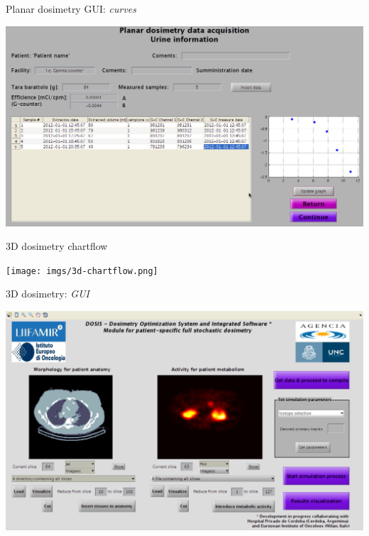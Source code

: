 \documentclass[ignorenonframetext,]{beamer}
\begin{document}
\begin{frame}{Planar dosimetry GUI: \emph{curves}}
\protect\hypertarget{planar-dosimetry-gui-curves}{}

\includegraphics{imgs/planar-curves.png}

\end{frame}

\begin{frame}{3D dosimetry chartflow}
\protect\hypertarget{d-dosimetry-chartflow}{}

\texttt{[image: imgs/3d-chartflow.png]}

\end{frame}

\begin{frame}{3D dosimetry: \emph{GUI}}
\protect\hypertarget{d-dosimetry-gui}{}

\includegraphics{imgs/3d-main.png}

\end{frame}
\end{document}

